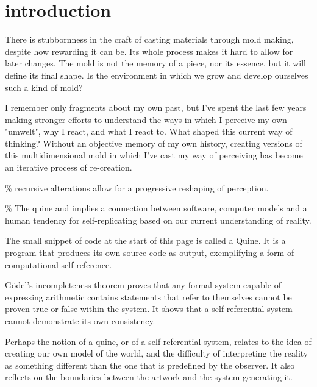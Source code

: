 \chapter*{introduction}
\begin{center}
\vspace{2cm}
\begin{flushright}
\footnotesize 

\end{flushright}
\vspace{2cm}
\end{center}
\normalsize

There is stubbornness in the craft of casting materials through mold making, despite how rewarding it can be. Its whole process makes it hard to allow for later changes. The mold is not the memory of a piece, nor its essence, but it will define its final shape. Is the environment in which we grow and develop ourselves such a kind of mold? 

I remember only fragments about my own past, but I’ve spent the last few years making stronger efforts to understand the ways in which I perceive my own "umwelt", why I react, and what I react to.  What shaped this current way of thinking? Without an objective memory of my own history, creating versions of this multidimensional mold in which I’ve cast my way of perceiving has become an iterative process of re-creation.


{\scriptsize \textcolor{comment}{\% recursive alterations allow for a progressive reshaping of perception. }}

{\scriptsize \textcolor{comment}{\% The quine and implies a connection between software, computer models and a human tendency for self-replicating based on our current understanding of reality.}}

The small snippet of code at the start of this page is called a Quine. It is a program that produces its own source code as output, exemplifying a form of computational self-reference. 

Gödel’s incompleteness theorem proves that any formal system capable of expressing arithmetic contains statements that refer to themselves cannot be proven true or false within the system. It shows that a self-referential system cannot demonstrate its own consistency.

Perhaps the notion of a quine, or of a self-referential system, relates to the idea of creating our own model of the world, and the difficulty of interpreting the reality as something different than the one that is predefined by the observer. It also reflects on the boundaries between the artwork and the system generating it.

